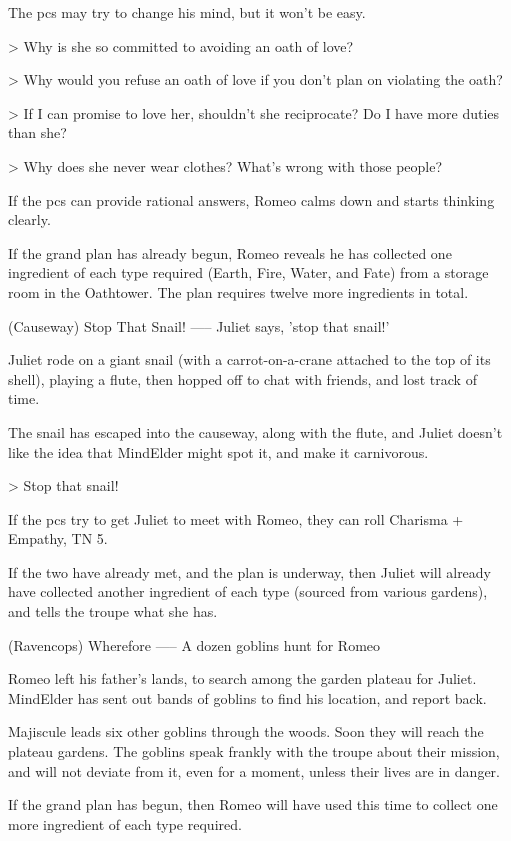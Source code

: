 The \glspl{pc} may try to change his mind, but it won't be easy.

> Why is she so committed to avoiding an oath of love?

> Why would you refuse an oath of love if you don't plan on violating the oath?

> If I can promise to love her, shouldn't she reciprocate?  Do I have more duties than she?

> Why does she never wear clothes?  What's wrong with those people?

If the \glspl{pc} can provide rational answers, Romeo calms down and starts thinking clearly.

If the grand plan has already begun,
Romeo reveals he has collected one \gls{ingredient} of each type required (Earth, Fire, Water, and Fate) from a storage room in the Oathtower.
The plan requires twelve more \glspl{ingredient} in total.

(Causeway) Stop That Snail!
-----
{Juliet says, 'stop that snail!'}

Juliet rode on a giant snail (with a carrot-on-a-crane attached to the top of its shell), playing a flute, then hopped off to chat with friends, and lost track of time.

The snail has escaped into the causeway, along with the flute, and Juliet doesn't like the idea that MindElder might spot it, and make it carnivorous.

> Stop that snail!

If the \glspl{pc} try to get Juliet to meet with Romeo,
they can roll Charisma + Empathy, TN 5.

If the two have already met, and the plan is underway,
then Juliet will already have collected another \gls{ingredient} of each type (sourced from various gardens), and tells the troupe what she has.

(Ravencops) Wherefore
-----
{A dozen goblins hunt for Romeo}

Romeo left his father's lands, to search among the garden plateau for Juliet.
MindElder has sent out bands of goblins to find his location, and report back.

Majiscule leads six other goblins through the woods.
Soon they will reach the plateau gardens.
The goblins speak frankly with the troupe about their mission, and will not deviate from it, even for a moment, unless their lives are in danger.

If the grand plan has begun,
then Romeo will have used this time to collect one more \gls{ingredient} of each type required.


